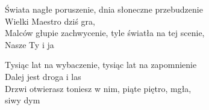 
\begin{text}
    Świata nagłe poruszenie, dnia słoneczne przebudzenie\\
    Wielki Maestro dziś gra,\\
    Malców głupie zachwycenie, tyle światła na tej scenie,\\
    Nasze Ty i ja

    Tysiąc lat na wybaczenie, tysiąc lat na zapomnienie\\
    Dalej jest droga i las\\
    Drzwi otwierasz toniesz w nim, piąte piętro, mgła,\\
    siwy dym
\end{text}

